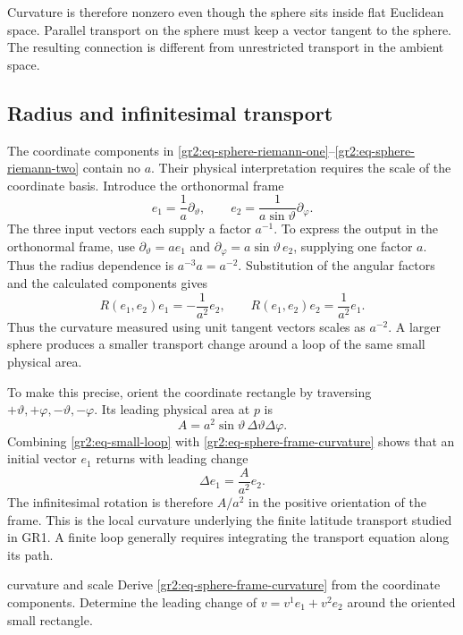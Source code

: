 \documentclass[11pt,a4paper]{article}
\numberwithin{equation}{section}
\begin{document}
Curvature is therefore nonzero even though the sphere sits inside flat
Euclidean space. Parallel transport on the sphere must keep a vector
tangent to the sphere. The resulting connection is different from
unrestricted transport in the ambient space.

\subsection{Radius and infinitesimal transport}

The coordinate components in
\eqref{gr2:eq-sphere-riemann-one}--\eqref{gr2:eq-sphere-riemann-two}
contain no \(a\). Their physical interpretation requires the scale of
the coordinate basis. Introduce the orthonormal frame
\[
 e_1=\frac1a\partial_\vartheta,
 \qquad e_2=\frac1{a\sin\vartheta}\partial_\varphi.
\]
The three input vectors each supply a factor \(a^{-1}\). To express
the output in the orthonormal frame, use
\(\partial_\vartheta=ae_1\) and
\(\partial_\varphi=a\sin\vartheta\,e_2\), supplying one factor \(a\).
Thus the radius dependence is \(a^{-3}a=a^{-2}\).
Substitution of the angular factors and the calculated components gives
\begin{equation}
 R(e_1,e_2)e_1=-\frac1{a^2}e_2,
 \qquad
 R(e_1,e_2)e_2=\frac1{a^2}e_1.
 \label{gr2:eq-sphere-frame-curvature}
\end{equation}
Thus the curvature measured using unit tangent vectors scales as
\(a^{-2}\). A larger sphere produces a smaller transport change around a
loop of the same small physical area.

To make this precise, orient the coordinate rectangle by traversing
\(+\vartheta,+\varphi,-\vartheta,-\varphi\). Its leading physical area
at \(p\) is
\[
 A=a^2\sin\vartheta\,\Delta\vartheta\Delta\varphi.
\]
Combining \eqref{gr2:eq-small-loop} with
\eqref{gr2:eq-sphere-frame-curvature} shows that an initial vector \(e_1\)
returns with leading change
\[
 \Delta e_1=\frac{A}{a^2}e_2.
\]
The infinitesimal rotation is therefore \(A/a^2\) in the positive
orientation of the frame. This is the local curvature underlying the
finite latitude transport studied in GR1. A finite loop generally
requires integrating the transport equation along its path.

\begin{studentwork}[2.7cm]{curvature and scale}
Derive \eqref{gr2:eq-sphere-frame-curvature} from the coordinate
components. Determine the leading change of
\(v=v^1e_1+v^2e_2\) around the oriented small rectangle.
\end{studentwork}
\end{document}

